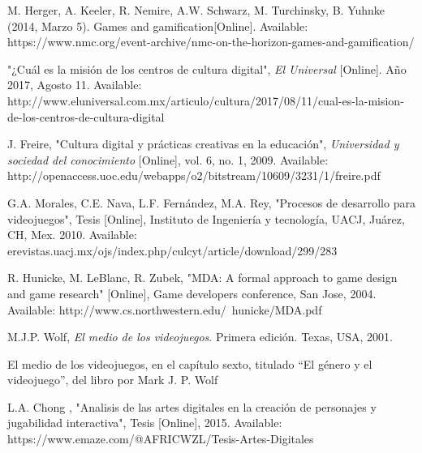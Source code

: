 \begin{thebibliography}{X}
	\textnormal M. Herger, A. Keeler, R. Nemire, A.W. Schwarz, M. Turchinsky, B. Yuhnke (2014, Marzo 5). Games and gamification[Online]. Available: https://www.nmc.org/event-archive/nmc-on-the-horizon-games-and-gamification/
	
	\textnormal "¿Cuál es la misión de los centros de cultura digital", \textit{El Universal} [Online]. Año 2017, Agosto 11. Available: http://www.eluniversal.com.mx/articulo/cultura/2017/08/11/cual-es-la-mision-de-los-centros-de-cultura-digital
	
	\textnormal J. Freire, "Cultura digital y prácticas creativas en la educación", \textit{Universidad y sociedad del conocimiento} [Online], vol. 6, no. 1, 2009. Available: http://openaccess.uoc.edu/webapps/o2/bitstream/10609/3231/1/freire.pdf
	
	\textnormal G.A. Morales, C.E. Nava, L.F. Fernández, M.A. Rey, "Procesos de desarrollo para videojuegos", Tesis [Online], Instituto de Ingeniería y tecnología, UACJ, Juárez, CH, Mex. 2010. Available: erevistas.uacj.mx/ojs/index.php/culcyt/article/download/299/283
	
	\textnormal R. Hunicke, M. LeBlanc, R. Zubek, "MDA: A formal approach to game design and game research" [Online], Game developers conference, San Jose, 2004. Available: http://www.cs.northwestern.edu/~hunicke/MDA.pdf

	\textnormal M.J.P. Wolf, \textit{El medio de los videojuegos}. Primera edición. Texas, USA, 2001.
	
	{El medio de los videojuegos}, en el capítulo sexto, titulado “El género y el videojuego”, del libro por Mark J. P. Wolf
	
	\textnormal L.A. Chong , "Analisis de las artes digitales en la creación de personajes y jugabilidad interactiva", Tesis [Online], 2015. Available: https://www.emaze.com/@AFRICWZL/Tesis-Artes-Digitales
\end{thebibliography}